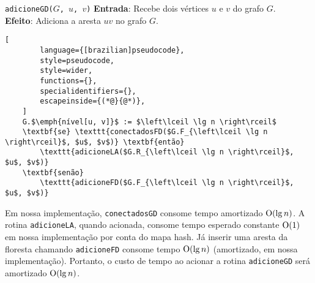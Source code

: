 \begin{programruledcaption}{\texttt{adicioneGD($G$, $u$, $v$)} \label{prog:addGD}}
    \noindent\textbf{Entrada}: Recebe dois vértices $u$ e $v$ do grafo $G$. \\
    \textbf{Efeito}: Adiciona a aresta $uv$ no grafo $G$.
    \vspace{-0.5\baselineskip}
    \begin{lstlisting}[
        language={[brazilian]pseudocode},
        style=pseudocode,
        style=wider,
        functions={},
        specialidentifiers={},
        escapeinside={(*@}{@*)},
    ]
    G.$\emph{nível[u, v]}$ := $\left\lceil \lg n \right\rceil$
    \textbf{se} \texttt{conectadosFD($G.F_{\left\lceil \lg n \right\rceil}$, $u$, $v$)} \textbf{então}
        \texttt{adicioneLA($G.R_{\left\lceil \lg n \right\rceil}$, $u$, $v$)}
    \textbf{senão}
        \texttt{adicioneFD($G.F_{\left\lceil \lg n \right\rceil}$, $u$, $v$)}
    \end{lstlisting}
    \vspace{-0.5\baselineskip}
\end{programruledcaption}

\raggedbottom


Em nossa implementação, \texttt{conectadosGD} consome tempo amortizado $\mathrm{O}(\lg n)$. A rotina \texttt{adicioneLA}, quando acionada, consome tempo esperado constante $\mathrm{O}(1)$ em nossa implementação por conta do mapa hash. Já inserir uma aresta da floresta chamando \texttt{adicioneFD} consome tempo $\mathrm{O}(\lg n)$ (amortizado, em nossa implementação). Portanto, o custo de tempo ao acionar a rotina \texttt{adicioneGD} será amortizado $\mathrm{O}(\lg n)$.

